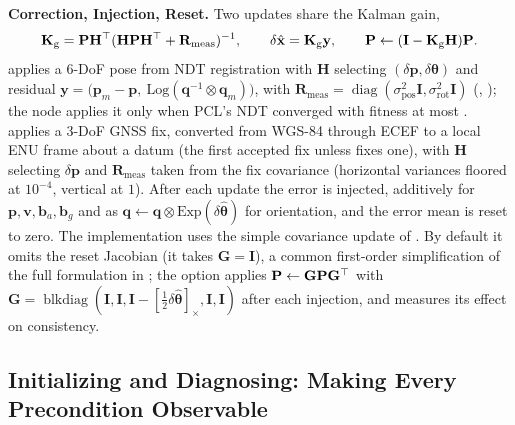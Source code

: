 \noindent\textbf{Correction, Injection, Reset.} Two updates share the Kalman gain,
\begin{equation}\label{eq:eskfupd}
  \mathbf{K}_{\mathrm{g}}=\mathbf{P}\mathbf{H}^{\top}(\mathbf{H}\mathbf{P}\mathbf{H}^{\top}+\mathbf{R}_{\mathrm{meas}})^{-1},\qquad
  \delta\hat{\mathbf{x}}=\mathbf{K}_{\mathrm{g}}\mathbf{y},\qquad
  \mathbf{P}\leftarrow(\mathbf{I}-\mathbf{K}_{\mathrm{g}}\mathbf{H})\mathbf{P}.
\end{equation}
 applies a 6-DoF pose from NDT registration with $\mathbf{H}$ selecting $(\delta\mathbf{p},\delta\boldsymbol{\theta})$ and residual $\mathbf{y}=\big(\mathbf{p}_m-\mathbf{p},\ \mathrm{Log}(\mathbf{q}^{-1}\otimes\mathbf{q}_m)\big)$, with $\mathbf{R}_{\mathrm{meas}}=\operatorname{diag}(\sigma_{\mathrm{pos}}^2\mathbf{I},\sigma_{\mathrm{rot}}^2\mathbf{I})$ (, ); the node applies it only when PCL's NDT converged with fitness at most .  applies a 3-DoF GNSS fix, converted from WGS-84 through ECEF to a local ENU frame about a datum (the first accepted fix unless  fixes one), with $\mathbf{H}$ selecting $\delta\mathbf{p}$ and $\mathbf{R}_{\mathrm{meas}}$ taken from the fix covariance (horizontal variances floored at $10^{-4}$, vertical at $1$). After each update the error is injected, additively for $\mathbf{p},\mathbf{v},\mathbf{b}_a,\mathbf{b}_g$ and as $\mathbf{q}\leftarrow\mathbf{q}\otimes\mathrm{Exp}(\delta\hat{\boldsymbol{\theta}})$ for orientation, and the error mean is reset to zero. The implementation uses the simple covariance update of . By default it omits the reset Jacobian (it takes $\mathbf{G}=\mathbf{I}$), a common first-order simplification of the full formulation in \citet{sola2017quaternion}; the option  applies $\mathbf{P}\leftarrow\mathbf{G}\mathbf{P}\mathbf{G}^{\top}$ with $\mathbf{G}=\operatorname{blkdiag}(\mathbf{I},\mathbf{I},\mathbf{I}-[\tfrac12\delta\hat{\boldsymbol{\theta}}]_\times,\mathbf{I},\mathbf{I})$ after each injection, and  measures its effect on consistency.

\subsection{Initializing and Diagnosing: Making Every Precondition Observable}\label{sec:init}

